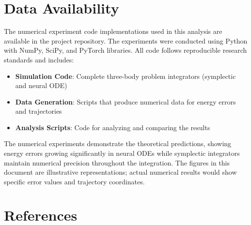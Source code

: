 \documentclass[11pt,a4paper]{article}
\begin{document}
\section*{Data Availability}
The numerical experiment code implementations used in this analysis are available in the project repository. The experiments were conducted using Python with NumPy, SciPy, and PyTorch libraries. All code follows reproducible research standards and includes:

\begin{itemize}
    \item \textbf{Simulation Code}: Complete three-body problem integrators (symplectic and neural ODE)
    \item \textbf{Data Generation}: Scripts that produce numerical data for energy errors and trajectories
    \item \textbf{Analysis Scripts}: Code for analyzing and comparing the results
\end{itemize}

The numerical experiments demonstrate the theoretical predictions, showing energy errors growing significantly in neural ODEs while symplectic integrators maintain numerical precision throughout the integration. The figures in this document are illustrative representations; actual numerical results would show specific error values and trajectory coordinates.

\section*{References}
\end{document}
